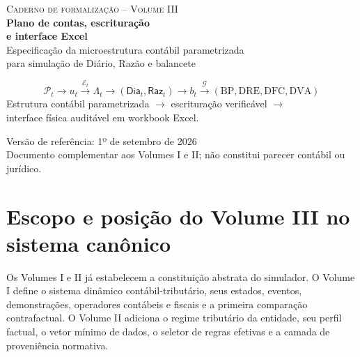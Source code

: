 \documentclass[11pt,a4paper]{article}
\newcommand{\BP}{\mathrm{BP}}
\newcommand{\DRE}{\mathrm{DRE}}
\newcommand{\DFC}{\mathrm{DFC}}
\newcommand{\DVA}{\mathrm{DVA}}
\newcommand{\cG}{\mathcal{G}}
\newcommand{\Plano}{\mathcal{P}}
\newcommand{\cE}{\mathcal{E}}
\newcommand{\Dia}{\mathsf{Dia}}
\newcommand{\Raz}{\mathsf{Raz}}
\begin{document}

\begin{titlepage}
\centering
\vspace*{1.2cm}
{\Large\color{Blue}\textsc{Caderno de formalização -- Volume III}}\\[0.50cm]
{\huge\bfseries\color{Navy}Plano de contas, escrituração\\[0.15cm]
e interface Excel}\\[0.65cm]
{\Large\color{Teal}Especificação da microestrutura contábil parametrizada\\
para simulação de Diário, Razão e balancete}\\[1.05cm]

\begin{tcolorbox}[width=0.92\textwidth,colback=LightGray,colframe=MidGray,boxrule=0.5pt,arc=2mm]
\centering
\large
\[
\boxed{
\Plano_t
\longrightarrow
u_t
\xrightarrow{\cE_t}
\Lambda_t
\longrightarrow
(\Dia_t,\Raz_t)
\longrightarrow
b_t
\xrightarrow{\cG}
(\BP,\DRE,\DFC,\DVA)
}
\]
\vspace{-1mm}
\small
Estrutura contábil parametrizada $\to$ escrituração verificável $\to$\\
interface física auditável em workbook Excel.
\end{tcolorbox}

\vfill
{\large Versão de referência: 1º de setembro de 2026}\\[0.15cm]
{\small Documento complementar aos Volumes I e II; não constitui parecer contábil ou jurídico.}
\end{titlepage}

\tableofcontents
\clearpage
{}

\section{Escopo e posição do Volume III no sistema canônico}

Os Volumes I e II já estabelecem a constituição abstrata do simulador. O Volume I define o sistema dinâmico contábil-tributário, seus estados, eventos, demonstrações, operadores contábeis e fiscais e a primeira comparação contrafactual. O Volume II adiciona o regime tributário da entidade, seu perfil factual, o vetor mínimo de dados, o seletor de regras efetivas e a camada de proveniência normativa.
\end{document}

